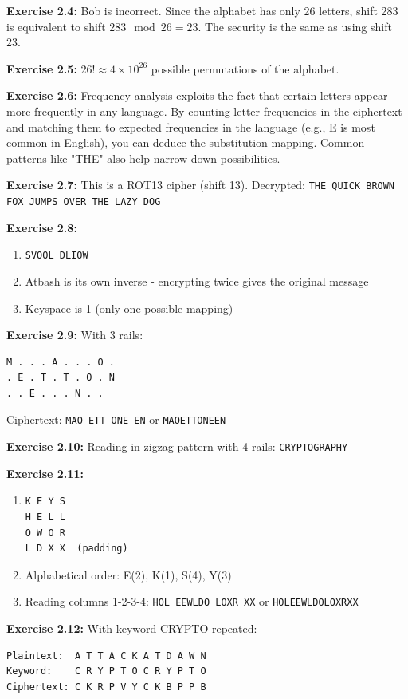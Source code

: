 \documentclass[11pt,a4paper]{report}
\begin{document}
\textbf{Exercise 2.4:}
Bob is incorrect. Since the alphabet has only 26 letters, shift 283 is equivalent to shift $283 \mod 26 = 23$. The security is the same as using shift 23.

\textbf{Exercise 2.5:}
$26! \approx 4 \times 10^{26}$ possible permutations of the alphabet.

\textbf{Exercise 2.6:}
Frequency analysis exploits the fact that certain letters appear more frequently in any language. By counting letter frequencies in the ciphertext and matching them to expected frequencies in the language (e.g., E is most common in English), you can deduce the substitution mapping. Common patterns like "THE" also help narrow down possibilities.

\textbf{Exercise 2.7:}
This is a ROT13 cipher (shift 13). Decrypted: \texttt{THE QUICK BROWN FOX JUMPS OVER THE LAZY DOG}

\textbf{Exercise 2.8:}
\begin{enumerate}[label=\alph*)]
    \item \texttt{SVOOL DLIOW}
    \item Atbash is its own inverse - encrypting twice gives the original message
    \item Keyspace is 1 (only one possible mapping)
\end{enumerate}

\textbf{Exercise 2.9:}
With 3 rails:
\begin{verbatim}
M . . . A . . . O .
. E . T . T . O . N
. . E . . . N . .
\end{verbatim}
Ciphertext: \texttt{MAO ETT ONE EN} or \texttt{MAOETTONEEN}

\textbf{Exercise 2.10:}
Reading in zigzag pattern with 4 rails: \texttt{CRYPTOGRAPHY}

\textbf{Exercise 2.11:}
\begin{enumerate}[label=\alph*)]
    \item
\begin{verbatim}
K E Y S
H E L L
O W O R
L D X X  (padding)
\end{verbatim}
    \item Alphabetical order: E(2), K(1), S(4), Y(3)
    \item Reading columns 1-2-3-4: \texttt{HOL EEWLDO LOXR XX} or \texttt{HOLEEWLDOLOXRXX}
\end{enumerate}

\textbf{Exercise 2.12:}
With keyword CRYPTO repeated:
\begin{verbatim}
Plaintext:  A T T A C K A T D A W N
Keyword:    C R Y P T O C R Y P T O
Ciphertext: C K R P V Y C K B P P B
\end{verbatim}
\end{document}
